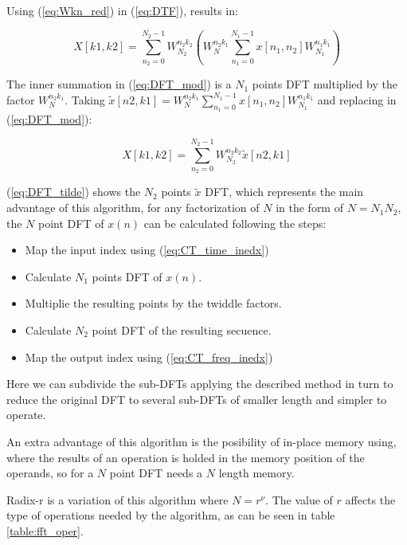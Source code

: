 \documentclass[conference]{IEEEtran}
\begin{document}
Using (\ref{eq:Wkn_red}) in (\ref{eq:DTF}), results in:

\begin{equation}
X[k1,k2]=\sum_{n_2=0}^{N_2-1}
W_{N_2}^{n_2k_2}\left(W_{N}^{n_2k_1}\sum_{n_1=0}^{N_1-1}x[n_1,n_2]W_{N_1}^{n_1k_1}\right)
\label{eq:DFT_mod}
\end{equation}

The inner summation in (\ref{eq:DFT_mod}) is a $N_1$ points DFT multiplied by the factor $W_{N}^{n_2k_1}$. 
Taking $\tilde{x}[n2,k1]=W_{N}^{n_2k_1}\sum_{n_1=0}^{N_1-1}x[n_1,n_2]W_{N_1}^{n_1k_1}$
and replacing in (\ref{eq:DFT_mod}):

\begin{equation}
X[k1,k2]=\sum_{n_2=0}^{N_2-1}
W_{N_2}^{n_2k_2}\tilde{x}[n2,k1]
\label{eq:DFT_tilde}
\end{equation}

(\ref{eq:DFT_tilde}) shows the $N_2$ points $\tilde{x}$ DFT, which represents the main advantage of this algorithm, 
for any factorization of $N$ in the form of $N=N_1N_2$, the $N$ point DFT of $x(n)$ can be calculated following the steps:

\begin{itemize}
  \item Map the input index using (\ref{eq:CT_time_inedx})
  \item Calculate $N_1$ points DFT of $x(n)$.
  \item Multiplie the resulting points by the twiddle factors.
  \item Calculate $N_2$ point DFT of the resulting secuence.
  \item Map the output index using (\ref{eq:CT_freq_inedx})
\end{itemize}

Here we can subdivide the sub-DFTs applying the described method in turn to reduce the original DFT to 
several sub-DFTs of smaller length and simpler to operate.

An extra advantage of this algorithm is the posibility of in-place memory using, where the results of an operation
is holded in the memory position of the operands, so for a $N$ point DFT needs a $N$ length memory.

Radix-r is a variation of this algorithm where $N=r^\nu$. The value of $r$ affects the type of operations needed by the algorithm, as can
be seen in table \ref{table:fft_oper}.
\end{document}
